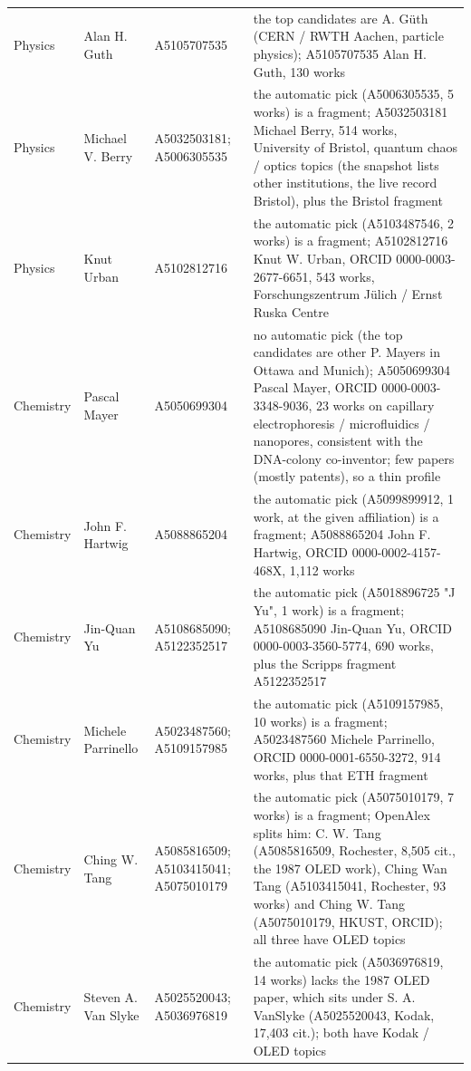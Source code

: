 \documentclass[11pt]{article}
\begin{document}
\begin{footnotesize}
\begin{longtable}{p{2.1cm}p{2.9cm}p{3.6cm}p{6.2cm}}
Physics & Alan H. Guth & A5105707535 & the top candidates are A. Güth (CERN / RWTH Aachen, particle physics); A5105707535 Alan H. Guth, 130 works\\
Physics & Michael V. Berry & A5032503181; A5006305535 & the automatic pick (A5006305535, 5 works) is a fragment; A5032503181 Michael Berry, 514 works, University of Bristol, quantum chaos / optics topics (the snapshot lists other institutions, the live record Bristol), plus the Bristol fragment\\
Physics & Knut Urban & A5102812716 & the automatic pick (A5103487546, 2 works) is a fragment; A5102812716 Knut W. Urban, ORCID 0000-0003-2677-6651, 543 works, Forschungszentrum Jülich / Ernst Ruska Centre\\
Chemistry & Pascal Mayer & A5050699304 & no automatic pick (the top candidates are other P. Mayers in Ottawa and Munich); A5050699304 Pascal Mayer, ORCID 0000-0003-3348-9036, 23 works on capillary electrophoresis / microfluidics / nanopores, consistent with the DNA-colony co-inventor; few papers (mostly patents), so a thin profile\\
Chemistry & John F. Hartwig & A5088865204 & the automatic pick (A5099899912, 1 work, at the given affiliation) is a fragment; A5088865204 John F. Hartwig, ORCID 0000-0002-4157-468X, 1,112 works\\
Chemistry & Jin-Quan Yu & A5108685090; A5122352517 & the automatic pick (A5018896725 "J Yu", 1 work) is a fragment; A5108685090 Jin-Quan Yu, ORCID 0000-0003-3560-5774, 690 works, plus the Scripps fragment A5122352517\\
Chemistry & Michele Parrinello & A5023487560; A5109157985 & the automatic pick (A5109157985, 10 works) is a fragment; A5023487560 Michele Parrinello, ORCID 0000-0001-6550-3272, 914 works, plus that ETH fragment\\
Chemistry & Ching W. Tang & A5085816509; A5103415041; A5075010179 & the automatic pick (A5075010179, 7 works) is a fragment; OpenAlex splits him: C. W. Tang (A5085816509, Rochester, 8,505 cit., the 1987 OLED work), Ching Wan Tang (A5103415041, Rochester, 93 works) and Ching W. Tang (A5075010179, HKUST, ORCID); all three have OLED topics\\
Chemistry & Steven A. Van Slyke & A5025520043; A5036976819 & the automatic pick (A5036976819, 14 works) lacks the 1987 OLED paper, which sits under S. A. VanSlyke (A5025520043, Kodak, 17,403 cit.); both have Kodak / OLED topics\\
\bottomrule\end{longtable}
\end{footnotesize}
\end{document}
